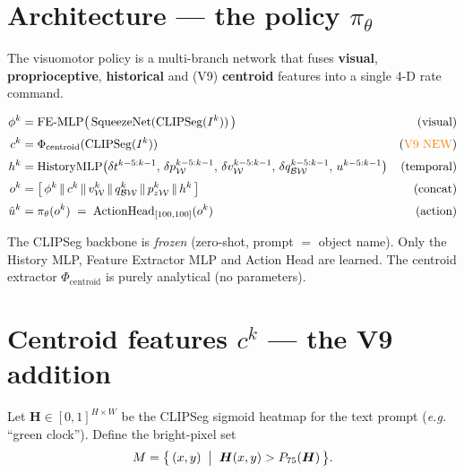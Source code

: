 \documentclass[11pt, a4paper]{article}
\newcommand{\Bw}{\mathcal{BW}}
\newcommand{\W}{\mathcal{W}}
\begin{document}
\section{Architecture --- the policy $\pi_\theta$}

The visuomotor policy is a multi-branch network that fuses
\textbf{visual}, \textbf{proprioceptive}, \textbf{historical} and (V9)
\textbf{centroid} features into a single 4-D rate command.

\begin{formulabox}
\begin{align}
\phi^k     &= \mathrm{FE\text{-}MLP}\bigl(\,\mathrm{SqueezeNet}(\mathrm{CLIPSeg}(I^k))\,\bigr)
              & \text{(visual)} \\[2pt]
c^k        &= \Phi_{\text{centroid}}(\mathrm{CLIPSeg}(I^k))
              & \text{(\textcolor{orange}{V9 NEW})} \\[2pt]
h^k        &= \mathrm{HistoryMLP}\bigl(\delta t^{k-5:k-1},\,\delta p_{\W}^{k-5:k-1},\,\delta v_{\W}^{k-5:k-1},\,\delta q_{\Bw}^{k-5:k-1},\,u^{k-5:k-1}\bigr)
              & \text{(temporal)} \\[2pt]
o^k        &= \bigl[\,\phi^k\,\|\,c^k\,\|\,v_{\W}^k\,\|\,q_{\Bw}^k\,\|\,p_{z\W}^k\,\|\,h^k\,\bigr]
              & \text{(concat)} \\[2pt]
\hat{u}^k  &= \pi_\theta(o^k) \;=\; \mathrm{ActionHead}_{[100,100]}(o^k)
              & \text{(action)}
\end{align}
\end{formulabox}

\noindent
The CLIPSeg backbone is \emph{frozen} (zero-shot, prompt $=$ object name).
Only the History MLP, Feature Extractor MLP and Action Head are learned.
The centroid extractor $\Phi_{\text{centroid}}$ is purely analytical (no parameters).

\section{Centroid features $c^k$ --- the V9 addition}

Let $\bm{H} \in [0,1]^{H \times W}$ be the CLIPSeg sigmoid heatmap for the
text prompt (\textit{e.g.} ``green clock''). Define the bright-pixel set
\[
M = \bigl\{\,(x,y)\;\bigm|\;\bm{H}(x,y) > P_{75}(\bm{H})\,\bigr\}.
\]
\end{document}
